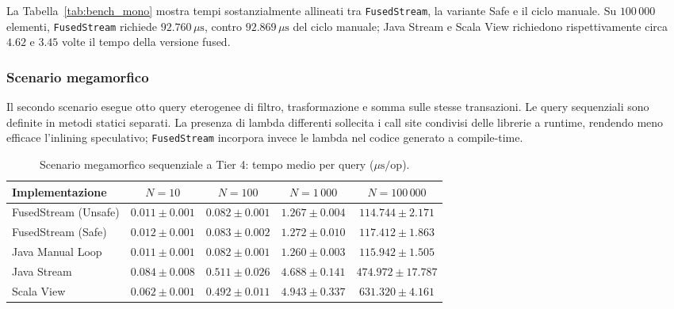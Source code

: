 \documentclass[a4paper,11pt]{report}
\theoremstyle{definition}
\begin{document}
La Tabella~\ref{tab:bench_mono} mostra tempi sostanzialmente allineati tra \texttt{FusedStream}, la variante Safe e il ciclo manuale. Su $100\,000$ elementi, \texttt{FusedStream} richiede $92.760\,\mu\text{s}$, contro $92.869\,\mu\text{s}$ del ciclo manuale; Java Stream e Scala View richiedono rispettivamente circa $4.62$ e $3.45$ volte il tempo della versione fused.

\subsubsection{Scenario megamorfico}
\label{subsubsec:bench-megamorfico}

Il secondo scenario esegue otto query eterogenee di filtro, trasformazione e somma sulle stesse transazioni. Le query sequenziali sono definite in metodi statici separati. La presenza di lambda differenti sollecita i call site condivisi delle librerie a runtime, rendendo meno efficace l'inlining speculativo; \texttt{FusedStream} incorpora invece le lambda nel codice generato a compile-time.

\begin{table}[htbp]
  \centering
  \caption{Scenario megamorfico sequenziale a Tier 4: tempo medio per query ($\mu\text{s}/\text{op}$).}
  \label{tab:bench_mega}
  \vspace{2mm}
  \small
  \setlength{\tabcolsep}{4pt}
  \begin{tabular}{lcccc}
    \toprule
    \textbf{Implementazione}      & \textbf{$N = 10$} & \textbf{$N = 100$} & \textbf{$N = 1\,000$} & \textbf{$N = 100\,000$} \\
    \midrule
    \textsf{FusedStream (Unsafe)} & $0.011 \pm 0.001$ & $0.082 \pm 0.001$  & $1.267 \pm 0.004$     & $114.744 \pm 2.171$     \\
    \textsf{FusedStream (Safe)}   & $0.012 \pm 0.001$ & $0.083 \pm 0.002$  & $1.272 \pm 0.010$     & $117.412 \pm 1.863$     \\
    \textsf{Java Manual Loop}     & $0.011 \pm 0.001$ & $0.082 \pm 0.001$  & $1.260 \pm 0.003$     & $115.942 \pm 1.505$     \\
    \textsf{Java Stream}          & $0.084 \pm 0.008$ & $0.511 \pm 0.026$  & $4.688 \pm 0.141$     & $474.972 \pm 17.787$    \\
    \textsf{Scala View}           & $0.062 \pm 0.001$ & $0.492 \pm 0.011$  & $4.943 \pm 0.337$     & $631.320 \pm 4.161$     \\
    \bottomrule
  \end{tabular}
\end{table}
\end{document}

